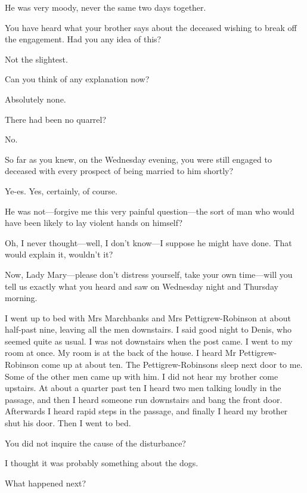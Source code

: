 \begin{dialogue}
 He was very moody, never the same two days together.

 You have heard what your brother says about the deceased wishing to break off the engagement. Had you any idea of this?

 Not the slightest.

 Can you think of any explanation now?

 Absolutely none.

 There had been no quarrel?

 No.

 So far as you knew, on the Wednesday evening, you were still engaged to deceased with every prospect of being married to him shortly?

 Ye-es. Yes, certainly, of course.

 He was not—forgive me this very painful question—the sort of man who would have been likely to lay violent hands on himself?

 Oh, I never thought—well, I don't know—I suppose he might have done. That would explain it, wouldn't it?

 Now, Lady Mary—please don't distress yourself, take your own time—will you tell us exactly what you heard and saw on Wednesday night and Thursday morning.

 I went up to bed with Mrs Marchbanks and Mrs  Pettigrew-Robinson at about half-past nine, leaving all the men downstairs. I said good night to Denis, who seemed quite as usual. I was not downstairs when the post came. I went to my room at once. My room is at the back of the house. I heard Mr Pettigrew-Robinson come up at about ten. The Pettigrew-Robinsons sleep next door to me. Some of the other men came up with him. I did not hear my brother come upstairs. At about a quarter past ten I heard two men talking loudly in the passage, and then I heard someone run downstairs and bang the front door. Afterwards I heard rapid steps in the passage, and finally I heard my brother shut his door. Then I went to bed.

 You did not inquire the cause of the disturbance?

  I thought it was probably something about the dogs.

 What happened next?


\end{dialogue}
